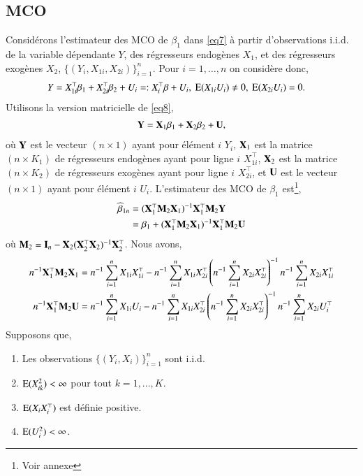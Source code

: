  \subsection{MCO}

 Considérons l'estimateur des MCO de $\beta_1$ dans \eqref{eq7} à partir d'observations i.i.d. de la variable dépendante $Y$,
 des régresseurs endogènes $X_1$, et des régresseurs exogènes $X_2$, $\{(Y_i, X_{1i}, X_{2i})\}_{i=1}^n$. 
 Pour $i=1, \ldots, n$ on considère donc,
\begin{align}
	Y &= X_{1i}^\top\beta_1 + X_{2i}^\top\beta_2 + U_i =: X_i^\top\beta + U_i, \ \operatorname{E}(X_{1i}U_i) \neq 0, \ \operatorname{E}(X_{2i}U_i) = 0.
	\label{eq8}
 \end{align}
 Utilisons la version matricielle de \eqref{eq8},
\begin{align*}
	\mathbf Y = \mathbf X_1\beta_1 + \mathbf X_2\beta_2 + \mathbf U,
	\end{align*}
	où $\mathbf Y$ est le vecteur $(n\times 1)$ ayant pour élément $i$ $Y_i$, $\mathbf X_1$ est la matrice $(n\times K_1)$ de régresseurs endogènes ayant pour ligne $i$ $X_{1i}^\top$, $\mathbf X_2$ est la matrice $(n\times K_2)$ de régresseurs exogènes ayant pour ligne $i$ $X_{2i}^\top$, et $\mathbf U$ est le vecteur $(n\times 1)$ ayant pour élément $i$ $U_i$. L'estimateur des MCO de $\beta_1$ est\footnote{Voir annexe},
	\begin{align*}
	\widehat{\beta}_{1n} &= (\mathbf X_1^\top\mathbf M_2\mathbf X_1)^{-1}\mathbf X_1^\top\mathbf M_2\mathbf Y \\
	&=\beta_1 +(\mathbf X_1^\top\mathbf M_2\mathbf X_1)^{-1}\mathbf X_1^\top\mathbf M_2\mathbf U
	\end{align*}
	où $\mathbf M_2 = \mathbf{I}_n - \mathbf X_2(\mathbf X_2^\top\mathbf X_2)^{-1}\mathbf X_2^\top$. Nous avons,
	\begin{align*}
	n^{-1}\mathbf X_1^\top\mathbf M_2\mathbf X_1 &= n^{-1}\sum_{i=1}^n X_{1i}X_{1i}^\top - n^{-1}\sum_{i=1}^n X_{1i}X_{2i}^\top\left(n^{-1}\sum_{i=1}^n X_{2i}X_{2i}^\top\right)^{-1} n^{-1}\sum_{i=1}^n X_{2i}X_{1i}^\top\\
	n^{-1}\mathbf X_1^\top\mathbf M_2\mathbf U &= n^{-1}\sum_{i=1}^n X_{1i}U_i - n^{-1}\sum_{i=1}^n X_{1i}X_{2i}^\top\left(n^{-1}\sum_{i=1}^n X_{2i}X_{2i}^\top\right)^{-1} n^{-1}\sum_{i=1}^n X_{2i}U_i^\top
	\end{align*}
	Supposons que,
	\begin{enumerate}[label = (A.\arabic*)]
	\item Les observations $\{(Y_i, X_i)\}_{i=1}^n$ sont i.i.d.
	\item $\operatorname{E}(X_{ik}^2) < \infty$ pour tout $k=1,...,K$.
	\item $\operatorname{E}(X_iX_i^\top)$ est définie positive.
	\item $\operatorname{E}(U_i^2) < \infty$.
	\end{enumerate}
